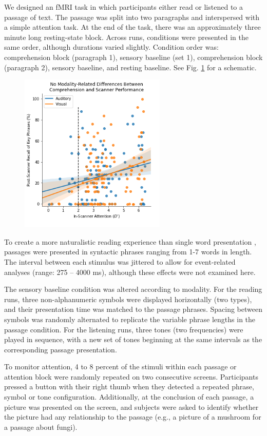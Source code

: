 We designed an fMRI task in which participants either read or listened to a passage of text. The passage was split into two paragraphs and interspersed with a simple attention task. At the end of the task, there was an approximately three minute long resting-state block. Across runs, conditions were presented in the same order, although durations varied slightly. Condition order was: comprehension block (paragraph 1), sensory baseline (set 1), comprehension block (paragraph 2), sensory baseline, and resting baseline. See Fig. \ref{fig:ch3-task-design} for a schematic.

\begin{figure}[t]
	\centering
	\includegraphics[height=3in]{images/ch3-eprime-recall.png}
	\caption[Schematic of the reading comprehension task.]{}
	\label{fig:ch3-task-design}
\end{figure}

To create a more naturalistic reading experience than single word presentation \citep{Rayner1998}, passages were presented in syntactic phrases ranging from 1-7 words in length. The interval between each stimulus was jittered to allow for event-related analyses (range: 275 – 4000 ms), although these effects were not examined here.

The sensory baseline condition was altered according to modality. For the reading runs, three non-alphanumeric symbols were displayed horizontally (two types), and their presentation time was matched to the passage phrases. Spacing between symbols was randomly alternated to replicate the variable phrase lengths in the passage condition. For the listening runs, three tones (two frequencies) were played in sequence, with a new set of tones beginning at the same intervals as the corresponding passage presentation. 

To monitor attention, 4 to 8 percent of the stimuli within each passage or attention block were randomly repeated on two consecutive screens.  Participants pressed a button with their right thumb when they detected a repeated phrase, symbol or tone configuration. Additionally, at the conclusion of each passage, a picture was presented on the screen, and subjects were asked to identify whether the picture had any relationship to the passage (e.g., a picture of a mushroom for a passage about fungi). 

